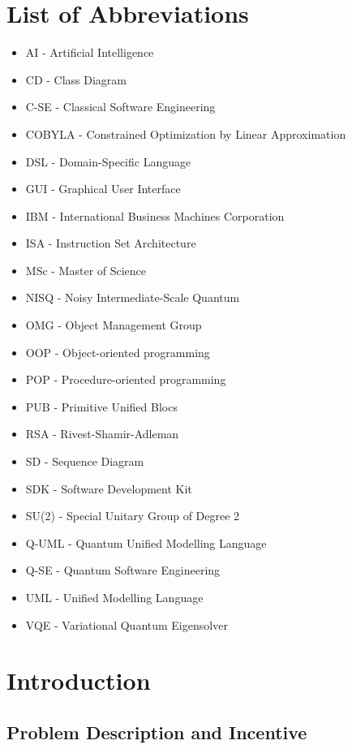 \documentclass{article}
\begin{document}
\section*{List of Abbreviations}
\begin{itemize}
    \item AI - Artificial Intelligence
    \item CD - Class Diagram
    \item C-SE - Classical Software Engineering
    \item COBYLA - Constrained Optimization by Linear Approximation
    \item DSL - Domain-Specific Language
    \item GUI - Graphical User Interface
    \item IBM - International Business Machines Corporation
    \item ISA - Instruction Set Architecture
    \item MSc - Master of Science
    \item NISQ - Noisy Intermediate-Scale Quantum
    \item OMG - Object Management Group
    \item OOP - Object-oriented programming
    \item POP - Procedure-oriented programming
    \item PUB - Primitive Unified Blocs
    \item RSA - Rivest-Shamir-Adleman
    \item SD - Sequence Diagram
    \item SDK - Software Development Kit
    \item SU(2) - Special Unitary Group of Degree 2
    \item Q-UML - Quantum Unified Modelling Language
    \item Q-SE - Quantum Software Engineering
    \item UML - Unified Modelling Language
    \item VQE - Variational Quantum Eigensolver
\end{itemize}
\newpage

\tableofcontents

\newpage

\section{Introduction}

\subsection{Problem Description and Incentive}
\end{document}

